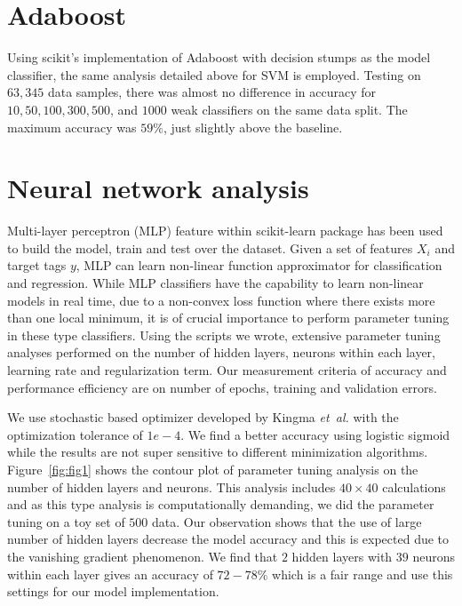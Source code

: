 \documentclass{article}
\newcommand*{\et}[0]{\textit{et~al. }}
\newcommand*{\Fig}[1]{Figure~\ref{fig:#1}}
\begin{document}
\section*{Adaboost}

Using scikit's implementation of Adaboost with decision stumps as the model classifier, the same analysis detailed above for SVM is employed. Testing on $63,345$ data samples, there was almost no difference in accuracy for $10, 50, 100, 300, 500$, and $1000$ weak classifiers on the same data split. The maximum accuracy was $59 \%$, just slightly above the baseline. 


\section*{Neural network analysis}

Multi-layer perceptron (MLP) feature within scikit-learn package has been used to build the model, train and test over the dataset. Given a set of features $X_i$ and target tags $y$, MLP can learn non-linear function approximator for classification and regression. While MLP classifiers have the capability to learn non-linear models in real time, due to a non-convex loss function where there exists more than one local minimum, it is of crucial importance to perform parameter tuning in these type classifiers. Using the scripts we wrote, extensive parameter tuning analyses performed on the number of hidden layers, neurons within each layer, learning rate and regularization term. Our measurement criteria of accuracy and performance efficiency are on number of epochs, training and validation errors. 

\noindent We use stochastic based optimizer developed by Kingma \et \cite{kingma2017} with the optimization tolerance of $1e-4$. We find a better accuracy using logistic sigmoid while the results are not super sensitive to different minimization algorithms. \Fig{fig1} shows the contour plot of parameter tuning analysis on the number of hidden layers and neurons. This analysis includes $40 \times 40$ calculations and as this type analysis is computationally demanding, we did the parameter tuning on a toy set of $500$ data. Our observation shows that the use of large number of hidden layers decrease the model accuracy and this is expected due to the vanishing gradient phenomenon. We find that $2$ hidden layers with $39$ neurons within each layer gives an accuracy of $72-78 \%$ which is a fair range and use this settings for our model implementation. 
\end{document}
